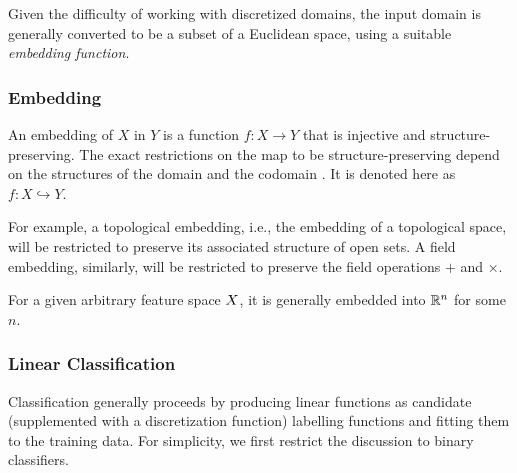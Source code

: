 Given the difficulty of working with discretized domains, the input domain is
generally converted to be a subset of a Euclidean space, using a suitable
\emph{embedding function}.

\subsubsection{Embedding}
An embedding of \(X\) in \(Y\) is a function \(f:X \to Y\) that is injective and
structure-preserving. The exact restrictions on the map to be
structure-preserving depend on the structures of the domain and the codomain
\cite{sankappanavar1981course}. It is denoted here as \(f:X\hookrightarrow Y\).

For example, a topological embedding, i.e., the embedding of a topological
space, will be restricted to preserve its associated structure of open sets. A
field embedding, similarly, will be restricted to preserve the field operations
\(+\) and \(\times\).

For a given arbitrary feature space \(X\), it is generally embedded
into \(\mathbb{R}^n\) for some \(n\).

\subsubsection{Linear Classification}
Classification generally proceeds by producing linear functions as candidate
(supplemented with a discretization function) labelling functions and fitting
them to the training data. For simplicity, we first restrict the discussion to
binary classifiers.


